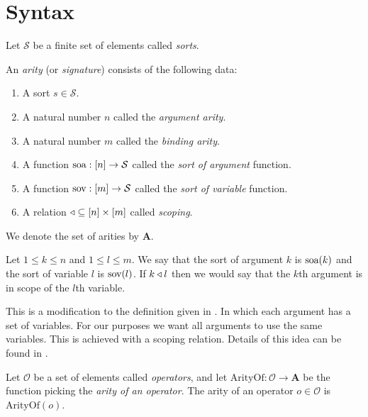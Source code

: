 \section{Syntax}

\begin{defin}[Sorts]
    Let $\mathcal{S}$ be a finite set of elements called \emph{sorts}.
\end{defin}

\begin{defin}[Arity]
    An \emph{arity} (or \emph{signature}) consists of the following data:
    \begin{enumerate}
        \setlength{\itemsep}{0pt}
        \item A sort $s \in \mathcal{S}$.
        \item A natural number $n$ called the \emph{argument arity}.
        \item A natural number $m$ called the \emph{binding arity}.
        \item A function $\text{soa} : [n] \to \mathcal{S}$ called the \emph{sort of argument} function.
        \item A function $\text{sov} : [m] \to \mathcal{S}$ called the \emph{sort of variable} function.
        \item A relation $\triangleleft \subseteq [n] \times [m]$ called \emph{scoping}.
    \end{enumerate}
    We denote the set of arities by $\mathbf{A}$.
\end{defin}

\begin{remark}
    Let $1 \le k \le n$ and $1 \le l \le m$. We say that the sort of argument $k$ is $\text{soa}(k)$ and the sort of variable $l$ is $\text{sov}(l)$. If $k \triangleleft l$ then we would say that the $k$th argument is in scope of the $l$th variable.
\end{remark}

\begin{remark}
    This is a modification to the definition given in \cite{harper_2016}. In which each argument has a set of variables. For our purposes we want all arguments to use the same variables. This is achieved with a scoping relation. Details of this idea can be found in \cite{nlab:initiality_project_-_raw_syntax}.
\end{remark}

\begin{defin}
    Let $\mathcal{O}$ be a set of elements called \emph{operators}, and let $\mathrm{ArityOf} : \mathcal{O} \to \mathbf{A}$ be the function picking the \emph{arity of an operator}. The arity of an operator $o\in \mathcal{O}$ is $\mathrm{ArityOf}(o)$.
\end{defin}

